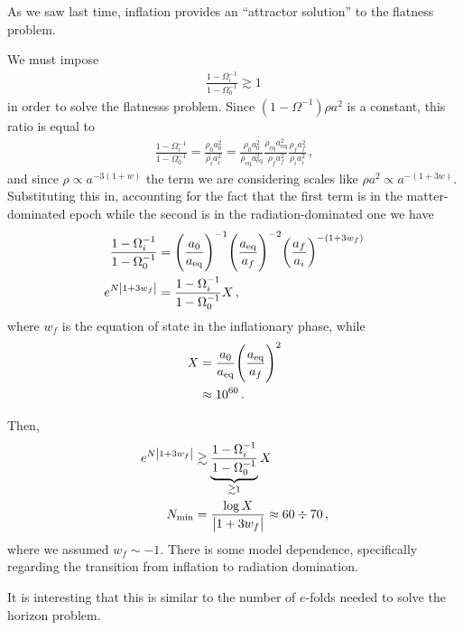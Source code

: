 \documentclass[main.tex]{subfiles}
\begin{document}

As we saw last time, inflation provides an ``attractor solution'' to the flatness problem. 

We must impose 
%
\begin{align}
\frac{1 - \Omega _i^{-1}}{1 - \Omega_0^{-1}} \gtrsim 1
\,
\end{align}
%
in order to solve the flatnesss problem. 
Since \(( 1- \Omega^{-1}) \rho a^2\) is a constant, this ratio is equal to 
%
\begin{align}
\frac{1 - \Omega _i^{-1}}{1 - \Omega_0^{-1}}
= 
\frac{\rho_0 a_0^2}{\rho _i a_i^2} 
= 
\frac{\rho_0 a_0^2}{\rho _{\text{eq}} a _{\text{eq}}^2}
\frac{{\rho _{\text{eq}} a _{\text{eq}}^2}}{\rho _f a_f^2} 
\frac{\rho _f a _f^2}{\rho _i a_i^2} 
\,,
\end{align}
%
and since \(\rho \propto a^{-3 (1+w)}\) the term we are considering scales like \(\rho a^2 \propto a^{-(1 + 3w)}\). 
Substituting this in, accounting for the fact that the first term is in the matter-dominated epoch while the second is in the radiation-dominated one we have 
%
\begin{align}
\frac{1 - \Omega _i^{-1}}{1 - \Omega_0^{-1}}
&= 
\qty(\frac{a_0 }{ a _{\text{eq}}})^{-1} 
\qty(\frac{a _{\text{eq}}}{a_f})^{-2}
\qty(\frac{a_f}{ a_i})^{-(1 + 3 w_f)}
\\
e^{N \abs{1 + 3 w_f}} &= \frac{1 - \Omega_i^{-1}}{1 - \Omega_0^{-1}} X
\,,
\end{align}
%
where \(w_f\) is the equation of state in the inflationary phase, while 
%
\begin{align}
X &= \frac{a_0 }{ a _{\text{eq}}}\qty(\frac{a _{\text{eq}}}{a_f})^2 \\
&\approx 10^{\num{60}}
\,.
\end{align}

Then, 
%
\begin{align}
e^{N \abs{1 + 3 w_f}} &\gtrsim \underbrace{\frac{1 - \Omega _i^{-1}}{1-\Omega_0^{-1}}}_{\gtrsim 1} X \\
N _{\text{min}} &= \frac{\log X}{\abs{1 + 3 w_f }} \approx 60 \divisionsymbol 70
\,,
\end{align}
%
where we assumed \(w_f \sim -1\). There is some model dependence, specifically regarding the transition from inflation to radiation domination. 

It is interesting that this is similar to the number of \(e\)-folds needed to solve the horizon problem. 
\end{document}
